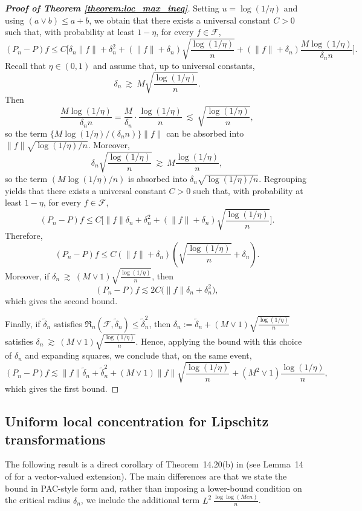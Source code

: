 \documentclass[11pt]{article}
\theoremstyle{plain}
\theoremstyle{definition} %
\begin{document}
\begin{proof}[\textbf{Proof of Theorem \ref{theorem:loc_max_ineq}}]
Setting $u=\log(1/\eta)$ and using $(a\vee b)\le a+b$, we obtain that there exists a
universal constant $C>0$ such that, with probability at least $1-\eta$, for every
$f\in\mathcal{F}$,
\[
(P_n-P)f
\le
C\Biggl[
\delta_n\|f\|+\delta_n^2
+
(\|f\|+\delta_n)\sqrt{\frac{\log(1/\eta)}{n}}
+
(\|f\|+\delta_n)\frac{M\log(1/\eta)}{\delta_n n}
\Biggr].
\]
Recall that $\eta\in(0,1)$ and assume that, up to universal constants,
\[
\delta_n \ \gtrsim\ M\sqrt{\frac{\log(1/\eta)}{n}}.
\]
Then
\[
\frac{M\log(1/\eta)}{\delta_n n}
=
\frac{M}{\delta_n}\cdot \frac{\log(1/\eta)}{n}
\ \lesssim\
\sqrt{\frac{\log(1/\eta)}{n}},
\]
so the term $\{M\log(1/\eta)/(\delta_n n)\}\|f\|$ can be absorbed into
$\|f\|\sqrt{\log(1/\eta)/n}$. Moreover,
\[
\delta_n\sqrt{\frac{\log(1/\eta)}{n}}
\ \gtrsim\
M\frac{\log(1/\eta)}{n},
\]
so the term $(M\log(1/\eta)/n)$ is absorbed into
$\delta_n\sqrt{\log(1/\eta)/n}$. Regrouping yields that there exists a universal
constant $C>0$ such that, with probability at least $1-\eta$, for every
$f\in\mathcal{F}$,
\[
(P_n-P)f
\le
C\Biggl[
\|f\|\delta_n
+
\delta_n^2
+
(\|f\| + \delta_n)\sqrt{\frac{\log(1/\eta)}{n}}
\Biggr].
\]
Therefore, 
\[
(P_n-P)f
\le
C(\|f\|+\delta_n)\left(\sqrt{\frac{\log(1/\eta)}{n}}+\delta_n\right).
\]
Moreover, if $\delta_n \ \gtrsim\ (M \vee 1)\sqrt{\frac{\log(1/\eta)}{n}}$, then
\[
(P_n-P)f
\lesssim
2C\bigl(\|f\|\delta_n +\delta_n^2\bigr),
\]
which gives the second bound.

Finally, if $\widetilde \delta_n$ satisfies $\mathfrak{R}_n(\mathcal{F},\widetilde \delta_n)\le \widetilde \delta_n^2$, then $\delta_n := \widetilde \delta_n + (M \vee 1)\sqrt{\frac{\log(1/\eta)}{n}}$ satisfies $\delta_n \ \gtrsim\ (M \vee 1)\sqrt{\frac{\log(1/\eta)}{n}}$. Hence, applying the bound with this choice of $\delta_n$ and expanding squares, we conclude that, on the same event,
\[
(P_n-P)f
\lesssim
\|f\|\widetilde \delta_n
+
\widetilde \delta_n^2
+
(M \vee 1)\|f\| \sqrt{\frac{\log(1/\eta)}{n}}
+
(M^2 \vee 1)\frac{\log(1/\eta)}{n},
\]
which gives the first bound.


\end{proof}

\subsection{Uniform local concentration for Lipschitz transformations}
\label{appendix::locallip}

 



The following result is a direct corollary of Theorem~14.20(b) in
\cite{wainwright2019high} (see Lemma~14 of \cite{foster2023orthogonal} for a vector-valued extension). The main
differences are that we state the bound in PAC-style form and, rather than imposing a
lower-bound condition on the critical radius \(\delta_n\), we include the
additional term \(L^2\,\frac{\log\log(M e n)}{n}\).
\end{document}
